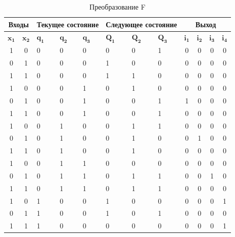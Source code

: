 \documentclass[a4paper, final]{article}
\begin{document}
\begin{table}[h!]
  \centering
  \caption{Преобразование F}
  \label{tbl:f}
  \footnotesize

  \begin{tabularx}{\textwidth}{|c|c|X|X|X||X|X|X|c|c|c|c|}
  \hline
  \multicolumn{2}{|c|}{\textbf{Входы}} & \multicolumn{3}{c||}{\textbf{Текущее состояние}} & \multicolumn{3}{c|}{\textbf{Следующее состояние}} & \multicolumn{4}{c|}{\textbf{Выход}} \\
  \hline
  $\mathbf{x_1}$& $\mathbf{x_2}$ & $\mathbf{q_1}$ & $\mathbf{q_2}$ & $\mathbf{q_3}$ & $\mathbf{Q_1}$ & $\mathbf{Q_2}$ & $\mathbf{Q_3}$ & $\mathbf{i_1}$ & $\mathbf{i_2}$ & $\mathbf{i_3}$ & $\mathbf{i_4}$ \\
  \hline
  \hline
  1 & 0 &   0 & 0 & 0 &  0 & 0 & 1 &  0 & 0 & 0 & 0\\
  \hline
  0 & 1 &   0 & 0 & 0 &  1 & 0 & 0 &  0 & 0 & 0 & 0\\
  \hline
  1 & 1 &   0 & 0 & 0 &  1 & 1 & 0 &  0 & 0 & 0 & 0\\
  \hline

  1 & 0 &   0 & 0 & 1 &  0 & 1 & 0 &  0 & 0 & 0 & 0\\
  \hline
  0 & 1 &   0 & 0 & 1 &  0 & 0 & 1 &  1 & 0 & 0 & 0\\
  \hline
  1 & 1 &   0 & 0 & 1 &  0 & 0 & 1 &  0 & 0 & 0 & 0\\

  \hline
  1 & 0 &   0 & 1 & 0 &  0 & 1 & 1 &  0 & 0 & 0 & 0\\
  \hline
  0 & 1 &   0 & 1 & 0 &  0 & 1 & 0 &  0 & 1 & 0 & 0\\
  \hline
  1 & 1 &   0 & 1 & 0 &  0 & 1 & 0 &  0 & 0 & 0 & 0\\
  \hline
  
  1 & 0 &   0 & 1 & 1 &  0 & 0 & 0 &  0 & 0 & 0 & 0\\
  \hline
  0 & 1 &   0 & 1 & 1 &  0 & 1 & 1 &  0 & 0 & 1 & 0\\
  \hline
  1 & 1 &   0 & 1 & 1 &  0 & 1 & 1 &  0 & 0 & 0 & 0\\
  \hline

  1 & 0 &   1 & 0 & 0 &  1 & 0 & 0 &  0 & 0 & 0 & 1\\
  \hline
  0 & 1 &   1 & 0 & 0 &  1 & 0 & 1 &  0 & 0 & 0 & 0\\
  \hline
  1 & 1 &   1 & 0 & 0 &  0 & 0 & 0 &  0 & 0 & 0 & 1\\
  \hline


\end{tabularx}
\end{table}
\end{document}
